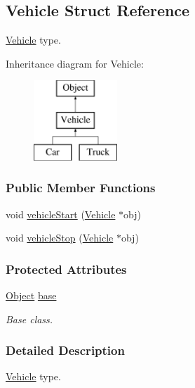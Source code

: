 \hypertarget{struct_vehicle}{}\subsection{Vehicle Struct Reference}
\label{struct_vehicle}


\hyperlink{struct_vehicle}{Vehicle} type.  


Inheritance diagram for Vehicle\+:\begin{figure}[H]
\begin{center}
\leavevmode
\includegraphics[height=3.000000cm]{struct_vehicle}
\end{center}
\end{figure}
\subsubsection*{Public Member Functions}
\begin{DoxyCompactItemize}
\item 
void \hyperlink{struct_vehicle_a6891d3d28853bc3fdd075596dc6de9f8}{vehicle\+Start} (\hyperlink{struct_vehicle}{Vehicle} $\ast$obj)
\item 
void \hyperlink{struct_vehicle_a4dcbcba43792dcd673a552b14479ab77}{vehicle\+Stop} (\hyperlink{struct_vehicle}{Vehicle} $\ast$obj)
\end{DoxyCompactItemize}
\subsubsection*{Protected Attributes}
\begin{DoxyCompactItemize}
\item 
\hypertarget{struct_vehicle_ad7970f528d429f6fc1725173e93a77c2}{}\label{struct_vehicle_ad7970f528d429f6fc1725173e93a77c2} 
\hyperlink{struct_object}{Object} \hyperlink{struct_vehicle_ad7970f528d429f6fc1725173e93a77c2}{base}
\begin{DoxyCompactList}\small\item\em Base class. \end{DoxyCompactList}\end{DoxyCompactItemize}


\subsubsection{Detailed Description}
\hyperlink{struct_vehicle}{Vehicle} type. 

